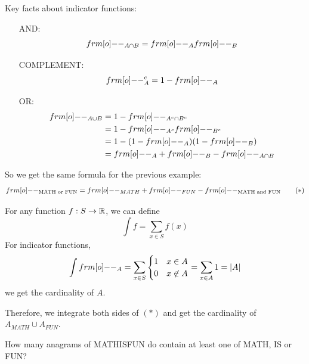 \documentclass[12pt]{article}
\begin{document}
\begin{proposition} Key facts about indicator functions:
    \begin{itemize}[align=left]
        \item[AND:] $$\1_{A\cap B}=\1_A\1_B$$
        \item[COMPLEMENT:] $$\1_{A}^c = 1-\1_A$$
        \item[OR:] \begin{align*}
            \1_{A\cup B} &= 1- \1_{A^c\cap B^c}\\
            &= 1-\1_{A^c}\1_{B^c}\\
            &= 1-(1-\1_A)(1-\1_B)\\
            &= \1_A+\1_B-\1_{A\cap B}
        \end{align*}  
    \end{itemize}
\end{proposition}

So we get the same formula for the previous example: \[\1_{\text{MATH or FUN}} = \1_{MATH} + \1_{FUN} - \1_{\text{MATH and FUN}}\qquad (*)\]

 For any function $f:S\to \mathbb{R}$, we can define \[\int f = \sum_{x\in S} f(x)\] For indicator functions,\[\int {\1_A} = \sum_{x\in S}\begin{cases}
    1 & x\in A\\ 0 & x\not \in A
\end{cases} = \sum_{x\in A} 1 = |A|\] we get the cardinality of $A$.

Therefore, we integrate both sides of $(*)$ and get the cardinality of $A_{MATH}\cup A_{FUN}$.

\eg How many anagrams of MATHISFUN do contain at least one of MATH, IS or FUN?
\end{document}
